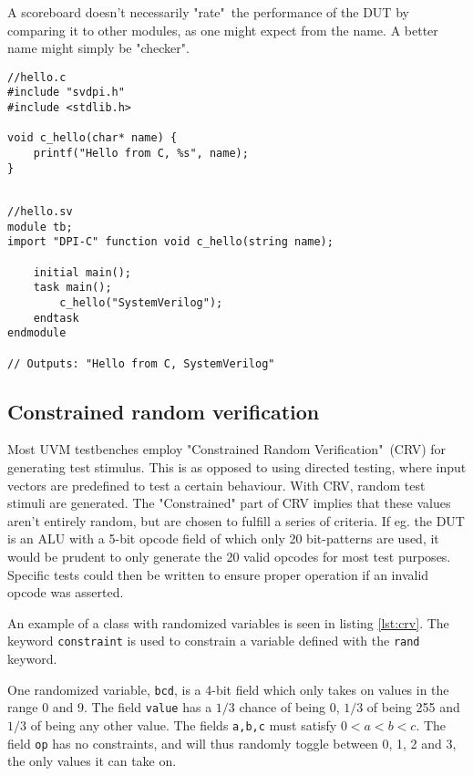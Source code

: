 \documentclass[journal]{IEEEtran}
\newcommand{\SV}{SystemVerilog\xspace}
\begin{document}
A scoreboard doesn't necessarily "rate"\, the performance of the DUT by comparing it to other modules, as one might expect from the name. A better name might simply be "checker". 

\begin{listing}[htbp]
\begin{verbatim}
//hello.c
#include "svdpi.h"
#include <stdlib.h>

void c_hello(char* name) {
	printf("Hello from C, %s", name);
}
\end{verbatim}
\begin{verbatim}

//hello.sv
module tb;
import "DPI-C" function void c_hello(string name);

	initial main();
	task main();
		c_hello("SystemVerilog");
	endtask
endmodule

// Outputs: "Hello from C, SystemVerilog"
\end{verbatim}
\caption{Short example showing how to use the \SV DPI to execute C-code from within \SV.}
\label{lst:dpi}
\end{listing}

\subsection{Constrained random verification}

Most UVM testbenches employ "Constrained Random Verification"\, (CRV) for generating test stimulus. This is as opposed to using directed testing, where input vectors are predefined to test a certain behaviour. With CRV, random test stimuli are generated. The "Constrained" part of CRV implies that these values aren't entirely random, but are chosen to fulfill a series of criteria. If eg. the DUT is an ALU with a 5-bit opcode field of which only 20 bit-patterns are used, it would be prudent to only generate the 20 valid opcodes for most test purposes. Specific tests could then be written to ensure proper operation if an invalid opcode was asserted.

An example of a class with randomized variables is seen in listing \ref{lst:crv}. The keyword \texttt{constraint} is used to constrain a variable defined with the \texttt{rand} keyword.

One randomized variable, \texttt{bcd}, is a 4-bit field which only takes on values in the range 0 and 9. The field \texttt{value} has a $1/3$ chance of being 0, $1/3$ of being 255 and $1/3$ of being any other value. The fields \texttt{a,b,c} must satisfy $0<a<b<c$. The field \texttt{op} has no constraints, and will thus randomly toggle between  0, 1, 2 and 3, the only values it can take on.
\end{document}
